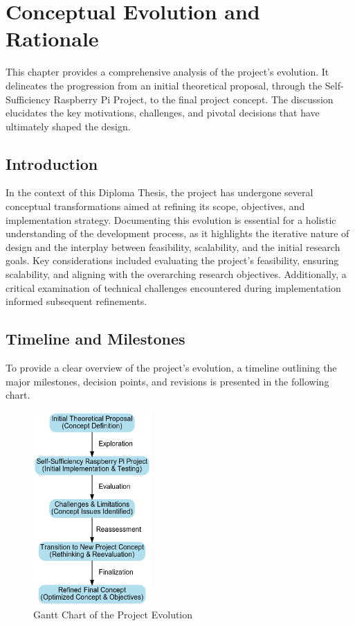 \chapter{Conceptual Evolution and Rationale}
\label{chap:Conceptual_Evolution_and_Rationale}

This chapter provides a comprehensive analysis of the project's evolution. It delineates the progression from an initial theoretical proposal, through the Self-Sufficiency Raspberry Pi Project, to the final project concept. The discussion elucidates the key motivations, challenges, and pivotal decisions that have ultimately shaped the design.

\section{Introduction}

In the context of this Diploma Thesis, the project has undergone several conceptual transformations aimed at refining its scope, objectives, and implementation strategy. Documenting this evolution is essential for a holistic understanding of the development process, as it highlights the iterative nature of design and the interplay between feasibility, scalability, and the initial research goals. Key considerations included evaluating the project's feasibility, ensuring scalability, and aligning with the overarching research objectives. Additionally, a critical examination of technical challenges encountered during implementation informed subsequent refinements.

\section{Timeline and Milestones}

To provide a clear overview of the project's evolution, a timeline outlining the major milestones, decision points, and revisions is presented in the following chart.
\begin{figure}[H]
    \centering
    \includegraphics[width=0.4\textwidth]{figures/concept_change_flowchart.png}
    \caption{Gantt Chart of the Project Evolution}
    \label{fig:GanttChart}
\end{figure}

